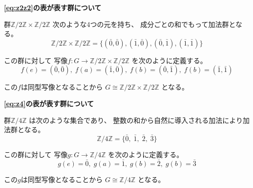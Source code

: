 \documentclass[12pt,b5paper]{ltjsarticle}
\begin{document}
\textbf{\eqref{eq:z2z2}の表が表す群について}

群$\mathbb{Z}/2 \mathbb{Z} \times  \mathbb{Z}/2 \mathbb{Z}$
次のような4つの元を持ち、
成分ごとの和でもって加法群となる。
\begin{equation}
 \mathbb{Z}/2 \mathbb{Z} \times  \mathbb{Z}/2 \mathbb{Z}
  =\{ (\bar{0},\bar{0}),(\bar{1},\bar{0}),(\bar{0},\bar{1}),(\bar{1},\bar{1}) \}
\end{equation}

この群に対して
写像$f:G\to \mathbb{Z}/2 \mathbb{Z} \times  \mathbb{Z}/2 \mathbb{Z}$
を次のように定義する。
\begin{equation}
 f(e)=(\bar{0},\bar{0}),\;
  f(a)=(\bar{1},\bar{0}),\;
  f(b)=(\bar{0},\bar{1}),\;
  f(b)=(\bar{1},\bar{1})
\end{equation}

この$f$は同型写像となることから
$G \cong \mathbb{Z}/2\mathbb{Z} \times \mathbb{Z}/2\mathbb{Z}$
となる。


\textbf{\eqref{eq:z4}の表が表す群について}

群$\mathbb{Z}/4\mathbb{Z}$
は次のような集合であり、
整数の和から自然に導入される加法により加法群となる。
\begin{equation}
 \mathbb{Z}/4\mathbb{Z}=
  \{ \bar{0},\; \bar{1},\; \bar{2},\; \bar{3} \}
\end{equation}

この群に対して
写像$g:G\to \mathbb{Z}/4 \mathbb{Z}$
を次のように定義する。
\begin{equation}
 g(e)=\bar{0},\;
  g(a)=\bar{1},\;
  g(b)=\bar{2},\;
  g(b)=\bar{3}
\end{equation}

この$g$は同型写像となることから
$G \cong \mathbb{Z}/4\mathbb{Z}$
となる。


\hrulefill
\end{document}

